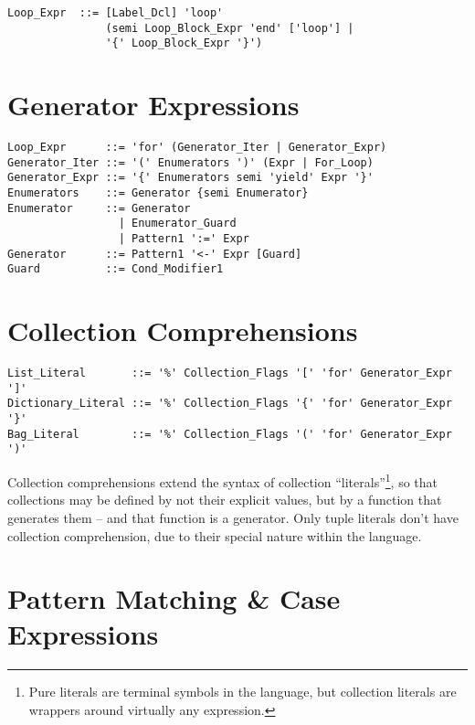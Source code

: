 \syntax\begin{lstlisting}
Loop_Expr  ::= [Label_Dcl] 'loop'
               (semi Loop_Block_Expr 'end' ['loop'] | 
               '{' Loop_Block_Expr '}')
\end{lstlisting}






\section{Generator Expressions}

\syntax\begin{lstlisting}
Loop_Expr      ::= 'for' (Generator_Iter | Generator_Expr)
Generator_Iter ::= '(' Enumerators ')' (Expr | For_Loop)
Generator_Expr ::= '{' Enumerators semi 'yield' Expr '}'
Enumerators    ::= Generator {semi Enumerator}
Enumerator     ::= Generator
                 | Enumerator_Guard
                 | Pattern1 ':=' Expr
Generator      ::= Pattern1 '<-' Expr [Guard]
Guard          ::= Cond_Modifier1
\end{lstlisting}






\section{Collection Comprehensions}

\syntax\begin{lstlisting}
List_Literal       ::= '%' Collection_Flags '[' 'for' Generator_Expr ']'
Dictionary_Literal ::= '%' Collection_Flags '{' 'for' Generator_Expr '}'
Bag_Literal        ::= '%' Collection_Flags '(' 'for' Generator_Expr ')'
\end{lstlisting}

Collection comprehensions extend the syntax of collection ``literals''\footnote{Pure literals are terminal symbols in the language, but collection literals are wrappers around virtually any expression.}, so that collections may be defined by not their explicit values, but by a function that generates them -- and that function is a generator. Only tuple literals don't have collection comprehension, due to their special nature within the language. 






\section{Pattern Matching \& Case Expressions}


